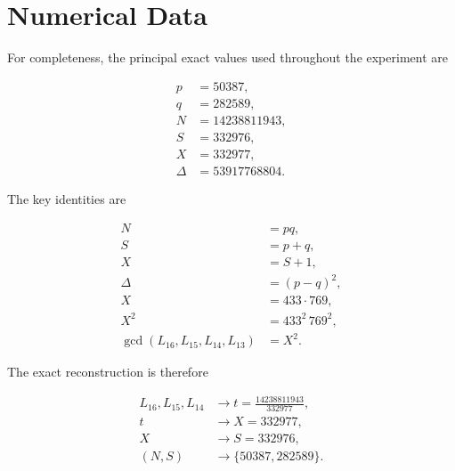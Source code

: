 \documentclass[11pt,a4paper]{article}
\theoremstyle{definition}
\theoremstyle{remark}
\newcommand{\gcdx}{\operatorname{gcd}}
\begin{document}
\section{Numerical Data}

For completeness, the principal exact values used throughout the
experiment are

\begin{align}
p&=50387,\\
q&=282589,\\
N&=14238811943,\\
S&=332976,\\
X&=332977,\\
\Delta&=53917768804.
\end{align}

The key identities are

\begin{align}
N&=pq,\\
S&=p+q,\\
X&=S+1,\\
\Delta&=(p-q)^2,\\
X&=433\cdot769,\\
X^2&=433^2\,769^2,\\
\gcdx(L_{16},L_{15},L_{14},L_{13})&=X^2.
\end{align}

The exact reconstruction is therefore

\[
\boxed{
\begin{aligned}
L_{16},L_{15},L_{14}
&\longrightarrow
t=\frac{14238811943}{332977},
\\
t
&\longrightarrow
X=332977,
\\
X
&\longrightarrow
S=332976,
\\
(N,S)
&\longrightarrow
\{50387,282589\}.
\end{aligned}
}
\]
\end{document}
